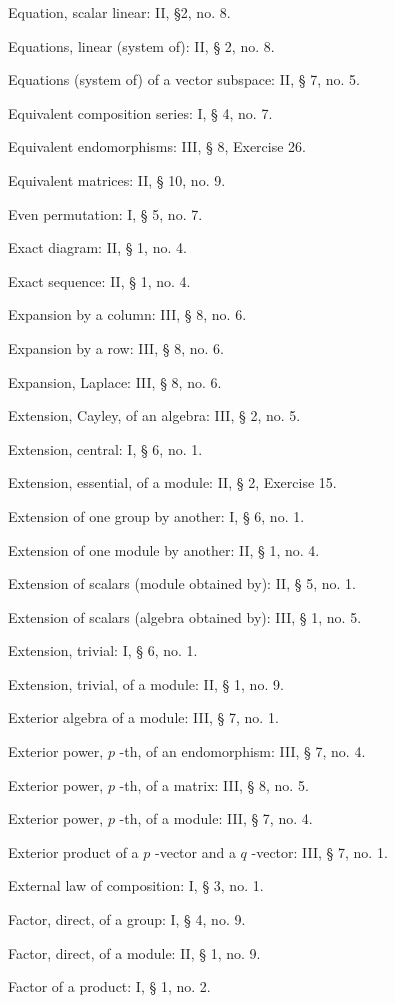 Equation, scalar linear: II, §2, no. 8.

Equations, linear (system of): II, § 2, no. 8.

Equations (system of) of a vector subspace: II, § 7, no. 5.

Equivalent composition series: I, § 4, no. 7.

Equivalent endomorphisms: III, § 8, Exercise 26.

Equivalent matrices: II, § 10, no. 9.

Even permutation: I, § 5, no. 7.

Exact diagram: II, § 1, no. 4.

Exact sequence: II, § 1, no. 4.

Expansion by a column: III, § 8, no. 6.

Expansion by a row: III, § 8, no. 6.

Expansion, Laplace: III, § 8, no. 6.

Extension, Cayley, of an algebra: III, § 2, no. 5.

Extension, central: I, § 6, no. 1.

Extension, essential, of a module: II, § 2, Exercise 15.

Extension of one group by another: I, § 6, no. 1.

Extension of one module by another: II, § 1, no. 4.

Extension of scalars (module obtained by): II, § 5, no. 1.

Extension of scalars (algebra obtained by): III, § 1, no. 5.

Extension, trivial: I, § 6, no. 1.

Extension, trivial, of a module: II, § 1, no. 9.

Exterior algebra of a module: III, § 7, no. 1.

Exterior power, \(p\) -th, of an endomorphism: III, § 7, no. 4.

Exterior power, \(p\) -th, of a matrix: III, § 8, no. 5.

Exterior power, \(p\) -th, of a module: III, § 7, no. 4.

Exterior product of a \(p\) -vector and a \(q\) -vector: III, § 7, no. 1.

External law of composition: I, § 3, no. 1.

Factor, direct, of a group: I, § 4, no. 9.

Factor, direct, of a module: II, § 1, no. 9.

Factor of a product: I, § 1, no. 2.

